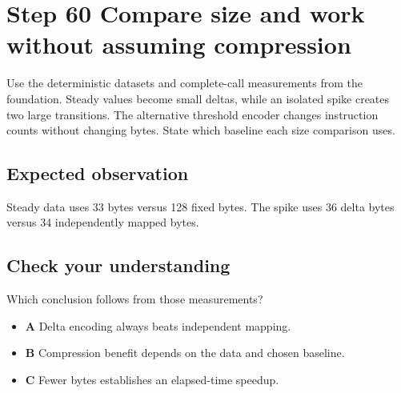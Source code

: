 \section{Step 60 Compare size and work without assuming compression}\label{delta-s60}

Use the deterministic datasets and complete-call measurements from the foundation. Steady values become small deltas, while an isolated spike creates two large transitions. The alternative threshold encoder changes instruction counts without changing bytes. State which baseline each size comparison uses.

\subsection{Expected observation}
Steady data uses 33 bytes versus 128 fixed bytes. The spike uses 36 delta bytes versus 34 independently mapped bytes.

\subsection{Check your understanding}
Which conclusion follows from those measurements?

\begin{itemize}
  \item \textbf{A} Delta encoding always beats independent mapping.
  \item \textbf{B} Compression benefit depends on the data and chosen baseline.
  \item \textbf{C} Fewer bytes establishes an elapsed-time speedup.
\end{itemize}
